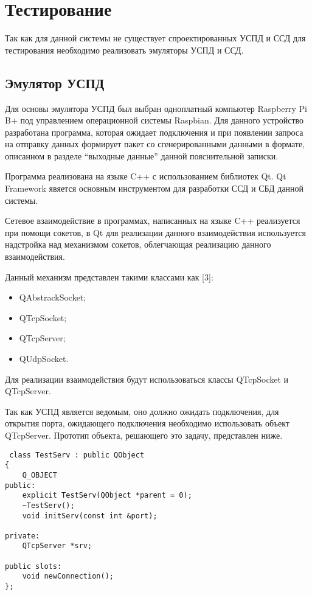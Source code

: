 \newpage
\section{Тестирование}
\setcounter{figure}{0}

Так как для данной системы не существует спроектированных УСПД и ССД для тестирования необходимо реализовать эмуляторы УСПД и ССД. 

\subsection{Эмулятор УСПД}

Для основы эмулятора УСПД был выбран одноплатный компьютер Raspberry Pi B+ под управлением операционной системы Raspbian. Для данного устройство разработана программа, которая ожидает подключения и при появлении запроса на отправку данных формирует пакет со сгенерированными данными в формате, описанном в разделе ``выходные данные'' данной пояснительной записки.

Программа реализована на языке C++ с использованием библиотек Qt. Qt Framework явяется основным инструментом для разработки ССД и СБД данной системы.

Сетевое взаимодействие в программах, написанных на языке C++ реализуется при помощи сокетов, в Qt для реализации данного взаимодействия используется надстройка над механизмом сокетов, облегчающая реализацию данного взаимодействия.

Данный механизм представлен такими классами как [3]:
\begin{itemize}
 \item QAbstrackSocket;
 \item QTcpSocket;
 \item QTcpServer;
 \item QUdpSocket.
\end{itemize}

Для реализации взаимодействия будут использоваться классы QTcpSocket и QTcpServer.

Так как УСПД является ведомым, оно должно ожидать подключения, для открытия порта, ожидающего подключения необходимо использовать объект QTcpServer. Прототип объекта, решающего это задачу, представлен ниже.

\begin{lstlisting}
 class TestServ : public QObject
{
    Q_OBJECT
public:
    explicit TestServ(QObject *parent = 0);
    ~TestServ();
    void initServ(const int &port);

private:
    QTcpServer *srv;

public slots:
    void newConnection();
};
\end{lstlisting}

